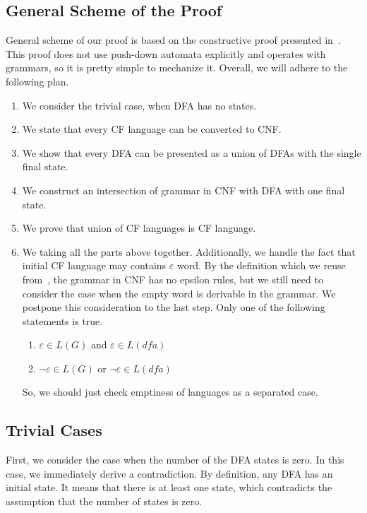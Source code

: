\subsection{General Scheme of the Proof}

General scheme of our proof is based on the constructive proof presented in~\cite{beigelproof}.
This proof does not use push-down automata explicitly and operates with grammars, so it is pretty simple to mechanize it.
Overall, we will adhere to the following plan. 

\begin{enumerate}
\item We consider the trivial case, when DFA has no states.
    \item We state that every CF language can be converted to CNF.
    \item We show that every DFA can be presented as a union of DFAs with the single final state.
    \item We construct an intersection of grammar in CNF with DFA with one final state.
    \item We prove that union of CF languages is CF language.
    \item We taking all the parts above together. 
	Additionally, we handle the fact that initial CF language may contains $\varepsilon$ word. By the definition which we reuse from~\cite{smolkaHofmann2016}, the grammar in CNF has no epsilon rules, but we still need to consider the case when the empty word is derivable in the grammar. We postpone this consideration to the last step. Only one of the following statements is true. 

\begin{enumerate}
	\item $\varepsilon \in L(G)$ and $\varepsilon \in L(\textit{dfa})$
	\item $\neg \varepsilon \in L(G)$ or $\neg \varepsilon \in L(\textit{dfa})$
\end{enumerate}

So, we should just check emptiness of languages as a separated case.

\end{enumerate}


\subsection{Trivial Cases}

First, we consider the case when the number of the DFA states is zero. 
In this case, we immediately derive a contradiction.
By definition, any DFA has an initial state. 
It means that there is at least one state, which contradicts the assumption that the number of states is zero.


